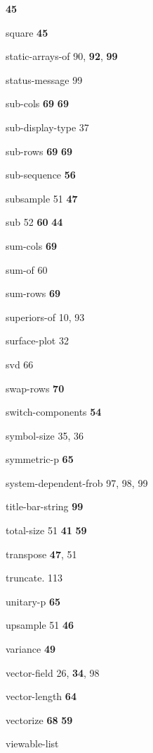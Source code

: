 \begin{theindex}
 {\bf 45}
\item {\ptt square}
 {\bf 45}
\item {\ptt static-arrays-of} 90, {\bf 92}, {\bf 99}
\item {\ptt status-message} 99
\item {\ptt sub-cols}
 {\bf 69}
 {\bf 69}
\item {\ptt sub-display-type} 37
\item {\ptt sub-rows} {\bf 69}
 {\bf 69}
\item {\ptt sub-sequence} {\bf 56}
\item {\ptt subsample} 51
 {\bf 47}
\item {\ptt sub} 52
 {\bf 60}
 {\bf 44}
\item {\ptt sum-cols} {\bf 69}
\item {\ptt sum-of} 60
\item {\ptt sum-rows} {\bf 69}
\item {\ptt superiors-of} 10, 93
\item {\ptt surface-plot} 32
\item {\ptt svd} 66
\item {\ptt swap-rows} {\bf 70}
\item {\ptt switch-components} {\bf 54}
\item {\ptt symbol-size} 35, 36
\item {\ptt symmetric-p} {\bf 65}
\item {\ptt system-dependent-frob} 97, 98, 99
\item {\ptt title-bar-string} {\bf 99}
\item {\ptt total-size} 51
 {\bf 41}
 {\bf 59}
\item {\ptt transpose} {\bf 47}, 51
\item {\ptt truncate.} 113
\item {\ptt unitary-p} {\bf 65}
\item {\ptt upsample} 51
 {\bf 46}
\item {\ptt variance} {\bf 49}
\item {\ptt vector-field} 26, {\bf 34}, 98
\item {\ptt vector-length}
 {\bf 64}
\item {\ptt vectorize} {\bf 68}
 {\bf 59}
\item {\ptt viewable-list}

\end{theindex}
